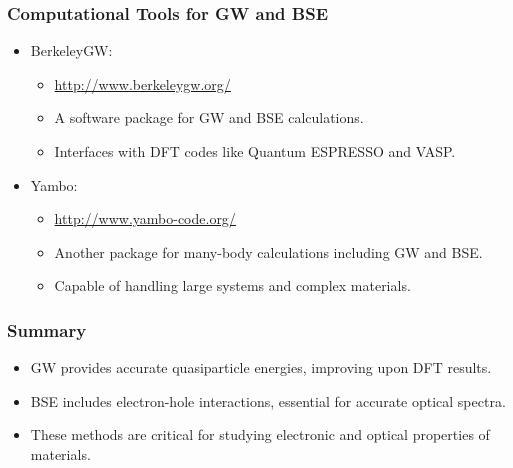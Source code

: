 \documentclass{CustomBeamer}
\begin{document}
        \begin{frame}
        \frametitle{Computational Tools for GW and BSE}
        \begin{itemize}
            \item BerkeleyGW: 
            \begin{itemize}
                \item \url{http://www.berkeleygw.org/}
                \item A software package for GW and BSE calculations.
                \item Interfaces with DFT codes like Quantum ESPRESSO and VASP.
            \end{itemize}
            \item Yambo: 
            \begin{itemize}
                \item \url{http://www.yambo-code.org/}
                \item Another package for many-body calculations including GW and BSE.
                \item Capable of handling large systems and complex materials.
            \end{itemize}
        \end{itemize}
        \end{frame}
        
        \begin{frame}
        \frametitle{Summary}
        \begin{itemize}
            \item GW provides accurate quasiparticle energies, improving upon DFT results.
            \item BSE includes electron-hole interactions, essential for accurate optical spectra.
            \item These methods are critical for studying electronic and optical properties of materials.
        \end{itemize}
        \end{frame}
        
    
\end{document}

